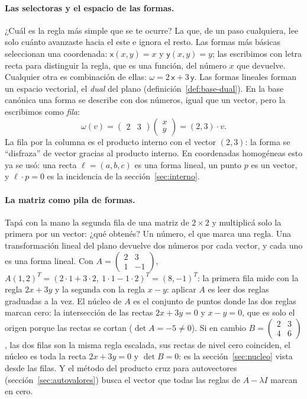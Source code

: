 \paragraph{Las selectoras y el espacio de las formas.} ¿Cuál es la regla más simple que se
te ocurre? La que, de un paso cualquiera, lee solo cuánto avanzaste hacia el este e ignora el
resto. Las formas más básicas seleccionan una
coordenada: \(\mathsf{x}(x,y)=x\) y \(\mathsf{y}(x,y)=y\); las escribimos con letra recta
para distinguir la regla, que es una función, del número \(x\) que devuelve. Cualquier otra es combinación de
ellas: \(\omega=2\,\mathsf{x}+3\,\mathsf{y}\). Las formas lineales forman un espacio
vectorial, el \emph{dual} del plano (definición~\ref{def:base-dual}). En la base canónica una
forma se describe con dos números, igual que un vector, pero la escribimos como \emph{fila}:
\[
  \omega(v)=\begin{pmatrix}2&3\end{pmatrix}\begin{pmatrix}x\\y\end{pmatrix}
  =(2,3)\cdot v .
\]
La fila por la columna es el producto interno con el vector \((2,3)\): la forma se
\enquote{disfraza} de vector gracias al producto interno. En coordenadas homogéneas esto ya se
usó: una recta \(\ell=(a,b,c)\) es una forma lineal, un punto \(p\) es un vector, y
\(\ell\cdot p=0\) es la incidencia de la sección~\ref{sec:interno}.

\paragraph{La matriz como pila de formas.} Tapá con la mano la segunda fila de una matriz de
\(2\times2\) y multiplicá solo la primera por un vector: ¿qué obtenés? Un número, el que
marca una regla. Una transformación lineal del plano devuelve dos
números por cada vector, y cada uno es una forma lineal. Con
\(A=\left(\begin{smallmatrix}2&3\\1&-1\end{smallmatrix}\right)\),
\(A(1,2)^T=(2\cdot1+3\cdot2,\ 1\cdot1-1\cdot2)^T=(8,-1)^T\): la primera fila mide con la regla \(2x+3y\) y la segunda con la regla \(x-y\): aplicar \(A\)
es leer dos reglas graduadas a la vez. El núcleo de \(A\) es el conjunto de puntos donde las
dos reglas marcan cero: la intersección de las rectas \(2x+3y=0\) y \(x-y=0\), que es solo el
origen porque las rectas se cortan (\(\det A=-5\neq0\)). Si en cambio
\(B=\begin{pmatrix}2&3\\4&6\end{pmatrix}\), las dos filas son la misma regla escalada, sus
rectas de nivel cero coinciden, el núcleo es toda la recta \(2x+3y=0\) y \(\det B=0\): es la
sección~\ref{sec:nucleo} vista desde las filas. Y el método del producto cruz para
autovectores (sección~\ref{sec:autovalores}) busca el vector que todas las reglas de
\(A-\lambda I\) marcan en cero.

